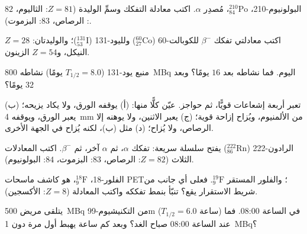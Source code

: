 \begin{exercise}[$\star$]\label{exo:g11:nucleus-radioactivity:3}
البولونيوم-210، ${}^{210}_{84}\mathrm{Po}$، مُصدِر $\alpha$. اكتب
معادلة التفكك وسمِّ الوليدة ($Z = 81$: الثاليوم، $82$: الرصاص، $83$:
البزموت).
\end{exercise}

\begin{exercise}[$\star$]\label{exo:g11:nucleus-radioactivity:4}
اكتب معادلتي تفكك $\beta^-$ للكوبالت-60 (${}^{60}_{27}\mathrm{Co}$)
ولليود-131 (${}^{131}_{53}\mathrm{I}$)؛ والوليدتان: $Z = 28$ النيكل،
و$Z = 54$ الزينون.
\end{exercise}

\begin{exercise}[$\star$]\label{exo:g11:nucleus-radioactivity:5}
منبع يود-131 ($T_{1/2} = 8.0$ يومًا) نشاطه \qty{800}{MBq}
اليوم. فما نشاطه بعد $16$ يومًا؟ وبعد $32$ يومًا؟
\end{exercise}

\begin{exercise}[$\star\star$]\label{exo:g11:nucleus-radioactivity:6}
تعبر أربعة إشعاعات  قويًّا، ثم حواجز. عيّن كلًّا منها:
(أ) يوقفه الورق، ولا يكاد  يزيحه؛ (ب) يعبر الورق،
ويوقفه \qty{4}{mm} من الألمنيوم، ويُزاح إزاحة قوية؛ (ج) يعبر الاثنين،
ولا يوهنه إلا الرصاص، ولا يُزاح؛ (د) مثل (ب)، لكنه يُزاح في الجهة الأخرى.
\end{exercise}

\begin{exercise}[$\star\star$]\label{exo:g11:nucleus-radioactivity:7}
الرادون-222 (${}^{222}_{86}\mathrm{Rn}$) يفتح سلسلة سريعة: تفكك $\alpha$،
ثم $\alpha$ آخر، ثم $\beta^-$. اكتب المعادلات الثلاث
($Z = 82$: الرصاص، $83$: البزموت، $84$: البولونيوم).
\end{exercise}

\begin{exercise}[$\star\star$]\label{exo:g11:nucleus-radioactivity:8}
الفلور-18، ${}^{18}_{9}\mathrm{F}$، هو كاشف ماسحات PET؛ والفلور
المستقر ${}^{19}_{9}\mathrm{F}$. فعلى أي جانب من شريط الاستقرار يقع؟
تنبّأ بنمط تفككه واكتب المعادلة ($Z = 8$: الأكسجين).
\end{exercise}

\begin{exercise}[$\star\star$]\label{exo:g11:nucleus-radioactivity:9}
يتلقى مريض \qty{500}{MBq} من التكنيشيوم-99m ($T_{1/2} = 6.0$ ساعة)
في الساعة 08:00. فما  عند الساعة 08:00 صباح الغد؟ وبعد كم
ساعة يهبط أول مرة دون \qty{1}{MBq}؟
\end{exercise}

